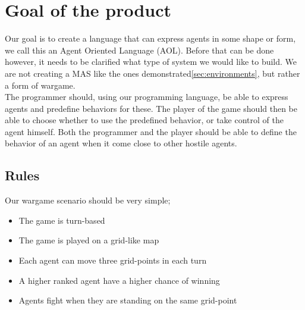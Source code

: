 \chapter{Goal of the product}

Our goal is to create a language that can express agents in some shape or form, we call this an Agent Oriented Language (AOL). Before that can be done however, it needs to be clarified what type of system we would like to build. We are not creating a MAS like the ones demonstrated\ref{sec:environments}, but rather a form of wargame.\\
\indent The programmer should, using our programming language, be able to express agents and predefine behaviors for these. The player of the game should then be able to choose whether to use the predefined behavior, or take control of the agent himself. Both the programmer and the player should be able to define the behavior of an agent when it come close to other hostile agents. \\

\section{Rules}
Our wargame scenario should be very simple;
\begin{itemize}
	\item The game is turn-based
	\item The game is played on a grid-like map
	\item Each agent can move three grid-points in each turn
	\item A higher ranked agent have a higher chance of winning
	\item Agents fight when they are standing on the same grid-point
\end{itemize}